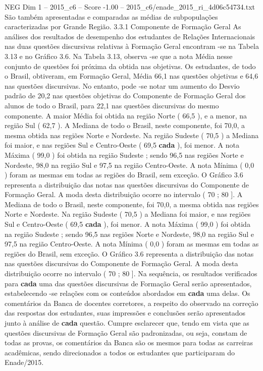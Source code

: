 \begin{textsample}{NEG Dim 1 – 2015\_c6 – Score -1.00 – 2015\_c6/enade\_2015\_ri\_4d06c54734.txt}
São também apresentadas e comparadas as médias de subpopulações caracterizadas por Grande Região. 3.3.1 Componente de Formação Geral As análises dos resultados de desempenho dos estudantes de Relações Internacionais nas duas questões discursivas relativas à Formação Geral encontram -se na Tabela 3.13 e no Gráfico 3.6.
Na Tabela 3.13, observa -se que a nota Média nesse conjunto de questões foi próxima da obtida nas objetivas.
Os estudantes, de todo o Brasil, obtiveram, em Formação Geral, Média 66,1 nas questões objetivas e 64,6 nas questões discursivas.
No entanto, pode -se notar um aumento do Desvio padrão de 20,2 nas questões objetivas do Componente de Formação Geral dos alunos de todo o Brasil, para 22,1 nas questões discursivas do mesmo componente.
A maior Média foi obtida na região Norte ( 66,5 ), e a menor, na região Sul ( 62,7 ).
A Mediana de todo o Brasil, neste componente, foi 70,0, a mesma obtida nas regiões Norte e Nordeste.
Na região Sudeste ( 70,5 ) a Mediana foi maior, e nas regiões Sul e Centro-Oeste ( 69,5 \textbf{cada} ), foi menor.
A nota Máxima ( 99,0 ) foi obtida na região Sudeste ; sendo 96,5 nas regiões Norte e Nordeste, 98,0 na região Sul e 97,5 na região Centro-Oeste.
A nota Mínima ( 0,0 ) foram as mesmas em todas as regiões do Brasil, sem exceção.
O Gráfico 3.6 representa a distribuição das notas nas questões discursivas do Componente de Formação Geral.
A moda desta distribuição ocorre no intervalo ( 70 ; 80 ].
A Mediana de todo o Brasil, neste componente, foi 70,0, a mesma obtida nas regiões Norte e Nordeste.
Na região Sudeste ( 70,5 ) a Mediana foi maior, e nas regiões Sul e Centro-Oeste ( 69,5 \textbf{cada} ), foi menor.
A nota Máxima ( 99,0 ) foi obtida na região Sudeste ; sendo 96,5 nas regiões Norte e Nordeste, 98,0 na região Sul e 97,5 na região Centro-Oeste.
A nota Mínima ( 0,0 ) foram as mesmas em todas as regiões do Brasil, sem exceção.
O Gráfico 3.6 representa a distribuição das notas nas questões discursivas do Componente de Formação Geral.
A moda desta distribuição ocorre no intervalo ( 70 ; 80 ].
Na sequência, os resultados verificados para \textbf{cada} uma das questões discursivas de Formação Geral serão apresentados, estabelecendo -se relações com os conteúdos abordados em \textbf{cada} uma delas.
Os comentários da Banca de docentes corretores, a respeito do observado na correção das respostas dos estudantes, suas impressões e conclusões serão apresentados junto à análise de \textbf{cada} questão.
Cumpre esclarecer que, tendo em vista que as questões discursivas de Formação Geral são padronizadas, ou seja, constam de todas as provas, os comentários da Banca são os mesmos para todas as carreiras acadêmicas, sendo direcionados a todos os estudantes que participaram do Enade/2015.

\end{textsample}
